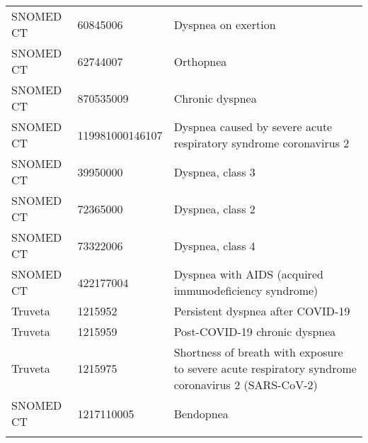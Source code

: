 \begin{longtable}{p{}p{}p{}}
  SNOMED CT & 60845006 & Dyspnea on exertion \\ 
  SNOMED CT & 62744007 & Orthopnea \\ 
  SNOMED CT & 870535009 & Chronic dyspnea \\ 
  SNOMED CT & 119981000146107 & Dyspnea caused by severe acute respiratory syndrome coronavirus 2 \\ 
  SNOMED CT & 39950000 & Dyspnea, class 3 \\ 
  SNOMED CT & 72365000 & Dyspnea, class 2 \\ 
  SNOMED CT & 73322006 & Dyspnea, class 4 \\ 
  SNOMED CT & 422177004 & Dyspnea with AIDS (acquired immunodeficiency syndrome) \\ 
  Truveta & 1215952 & Persistent dyspnea after COVID-19 \\ 
  Truveta & 1215959 & Post-COVID-19 chronic dyspnea \\ 
  Truveta & 1215975 & Shortness of breath with exposure to severe acute respiratory syndrome coronavirus 2 (SARS-CoV-2) \\ 
  SNOMED CT & 1217110005 & Bendopnea \\ 
  \hline
\label{tab:codes_dyspnea}
\end{longtable}
